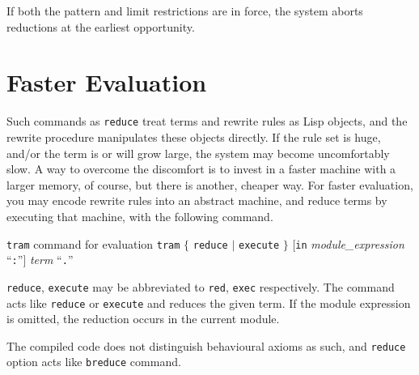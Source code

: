 \documentclass[a4paper]{memoir}
\begin{document}
If both the pattern and limit restrictions are in force,
the system aborts reductions at the earliest opportunity.

\section{Faster Evaluation}\label{sec:p2-tram-brute}

Such commands as \verb|reduce| treat terms and rewrite rules as
Lisp objects, and the rewrite procedure manipulates these objects
directly. If the rule set is huge, and/or the term is or will grow
large, the system may become uncomfortably slow. A way to overcome
the discomfort is to invest in a faster machine with a larger memory,
of course, but there is another, cheaper way. For faster evaluation,
you may encode rewrite rules into an abstract machine, and
reduce terms by executing that machine, with the following command.

\begin{bsyntax} \texttt{tram} command for evaluation \Hline
{}
\texttt{tram} $\{$ \texttt{reduce} $|$ \texttt{execute} $\}$ $[$\texttt{in} \textit{module\_expression} ``\texttt{:}''$]$ \textit{term} ``\texttt{.}''
\end{bsyntax}

\verb|reduce|, \verb|execute| may be abbreviated to \verb|red|, \verb|exec|
respectively.
The command acts like \verb|reduce| or \verb|execute| and reduces
the given term. If the module expression is omitted, the reduction
occurs in the current module.

\begin{warning}
  The compiled code does not distinguish behavioural axioms as such,
  and \verb|reduce| option acts like \verb|breduce| command.
\end{warning}
\end{document}
